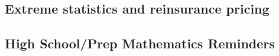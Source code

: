 \documentclass[french,a4paper]{article}
\theoremstyle{sansparenthese}
\begin{document}
\begin{multicols}{2}	
	
\end{multicols}

\begin{center}
	\section*{Extreme statistics and reinsurance pricing}
	\medskip
\end{center}

\begin{multicols}{2}
	
\end{multicols}

\newpage

\begin{center}
\section*{High School/Prep Mathematics Reminders}
\medskip
\end{center}

\begin{multicols}{2}	
	
\end{multicols}
\end{document}
